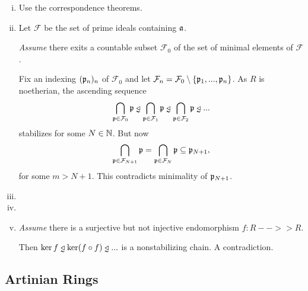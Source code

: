 	\begin{sketch}
		\begin{enumerate}[(i)]
			\item{
				Use the correspondence theorems.
			}
			\item{
				Let $\mathcal{F}$ be the set of prime ideals containing $\mathfrak{a}$.

				\textit{Assume} there exits a countable subset $\mathcal{F}_0$ of the set of minimal elements of $\mathcal{F}$.
				\begin{tab}[1.3cm]
					Fix an indexing $(\mathfrak{p}_n)_n$ of $\mathcal{F}_0$ and let $\mathcal{F}_n = \mathcal{F}_0 \setminus \{\mathfrak{p}_1,...,\mathfrak{p}_n\}$. As $R$ is noetherian, the ascending sequence
					\begin{equation*}
						\Intersection \limits_{\ideal{p} \in \mathcal{F}_0} \ideal{p} \divneq \Intersection \limits_{\ideal{p} \in \mathcal{F}_1} \ideal{p} \divneq \Intersection \limits_{\ideal{p} \in \mathcal{F}_2} \ideal{p} \divneq ...
					\end{equation*}
					stabilizes for some $N \in \mathbb{N}$. But now
					\begin{equation*}
						\bigcap \limits_{\mathfrak{p} \in \mathcal{F}_{N+1}} \mathfrak{p} = \bigcap \limits_{\mathfrak{p} \in \mathcal{F}_{N}} \mathfrak{p} \subseteq \mathfrak{p}_{N+1},
					\end{equation*}
					 for some $m > N+1$. This contradicts minimality of $\mathfrak{p}_{N+1}$.
				\end{tab}
			}
			\item{

			}
			\item{

			}
			\item{
				\textit{Assume} there is a surjective but not injective endomorphism $f:R-->>R$.
				\begin{tab}[1.3cm]
					Then $\ker f \divneq \ker (f\circ f) \divneq ...$ is a nonstabilizing chain. A contradiction.
				\end{tab}
			}\vspace{-1.8em}
		\end{enumerate}
	\end{sketch}

	\newpage
	\subsection{Artinian Rings}

